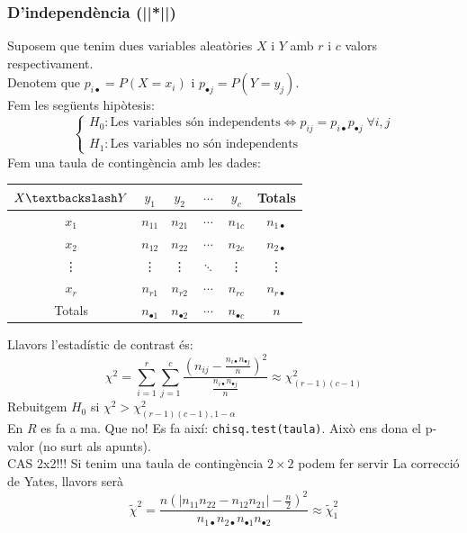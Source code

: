 \documentclass[a4paper]{sciposter}
\begin{document}
\begin{multicols}{3}
\subsubsection{D'independència (||*||)}
Suposem que tenim dues variables aleatòries $X$ i $Y$ amb $r$ i $c$ valors respectivament.\\
Denotem que $p_{i\bullet} = P(X = x_i)$ i $p_{\bullet j} = P(Y = y_j)$.\\
Fem les següents hipòtesis:
\begin{displaymath}
	\begin{cases}
		H_0: \text{Les variables són independents} \Leftrightarrow p_{ij} = p_{i\bullet}p_{\bullet j}\;\forall i, j\\
		H_1: \text{Les variables no són independents}
	\end{cases}
\end{displaymath}
Fem una taula de contingència amb les dades:\\
\begin{table}[h!]
	\centering
	\begin{tabular}{c|c c c c|c}
		$X\textbackslash Y$ & $y_1$ & $y_2$ & $\cdots$ & $y_c$ & Totals\\
		\hline
		$x_1$ & $n_{11}$ & $n_{21}$ & $\cdots$ & $n_{1c}$ & $n_{1\bullet}$\\
		$x_2$ & $n_{12}$ & $n_{22}$ & $\cdots$ & $n_{2c}$ & $n_{2\bullet}$\\
		\vdots & \vdots & \vdots & $\ddots$ & \vdots & \vdots\\
		$x_r$ & $n_{r1}$ & $n_{r2}$ & $\cdots$ & $n_{rc}$ & $n_{r\bullet}$\\
		\hline
		Totals & $n_{\bullet 1}$ & $n_{\bullet 2}$ & $\cdots$ & $n_{\bullet c}$ & $n$
	\end{tabular}
\end{table}
Llavors l'estadístic de contrast és:
\begin{displaymath}
	\chi^2 = \sum_{i=1}^r\sum_{j=1}^c \frac{(n_{ij} - \frac{n_{i\bullet}n_{\bullet j}}{n})^2}{\frac{n_{i\bullet}n_{\bullet j}}{n}} \approx \chi^2_{(r-1)(c-1)}
\end{displaymath}
Rebuitgem $H_0$ si $\chi^2 > \chi^2_{(r-1)(c-1),1-\alpha}$\\
En $R$ es fa a ma. Que no! Es fa així: \texttt{chisq.test(taula)}. Això ens dona el p-valor (no surt als apunts).\\
CAS 2x2!!! Si tenim una taula de contingència $2\times 2$ podem fer servir La correcció de Yates, llavors serà\\
\begin{displaymath}
	\tilde{\chi}^2 = \frac{n\left(|n_{11}n_{22} - n_{12}n_{21}| - \frac{n}{2}\right)^2}{n_{1\bullet}n_{2\bullet}n_{\bullet1}n_{\bullet2}} \approx \tilde{\chi}^2_{1}
\end{displaymath}

\end{multicols}
\end{document}
